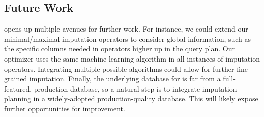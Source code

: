 \subsection{Future Work}
\ProjectName{} opens up multiple avenues for further work. For instance, we could extend our minimal/maximal imputation
operators to consider global information, such as the specific columns needed in operators higher up in the query plan.
Our optimizer uses the same machine learning algorithm in all instances of imputation operators. Integrating multiple
possible algorithms could allow for further fine-grained imputation. Finally, the underlying database for \ProjectName{}
is far from a full-featured, production database, so a natural step is to integrate imputation planning in a widely-adopted
production-quality database. This will likely expose further opportunities for improvement.






